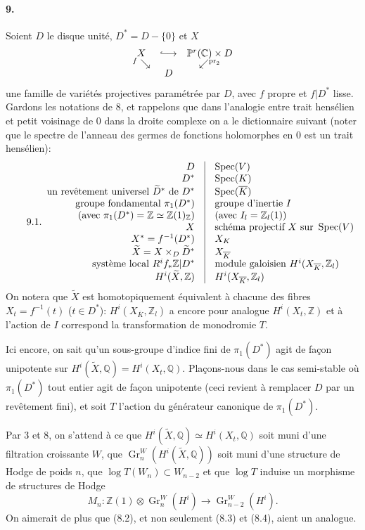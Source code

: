 \documentclass[10pt]{article}
\newcommand{\C}{\mathbb C}
\newcommand{\Q}{\mathbb Q}
\newcommand{\Z}{\mathbb Z}
\newcommand{\Gr}{\operatorname{Gr}}
\newcommand{\Spec}{\operatorname{Spec}}
\newcommand{\pr}{\operatorname{pr}}
\newcommand{\barK}{\overline{K}}
\newcommand{\wt}{\widetilde}
\begin{document}
\paragraph{9.} Soient $D$ le disque unité, $D^*=D-\{0\}$ et $X$
\[
\begin{array}{ccc}
X&\lhook\joinrel\longrightarrow&\mathbb P^r(\C)\times D\\[-0.2em]
{}^{f}\searrow&&\swarrow^{\pr_2}\\[-0.2em]
& D&
\end{array}
\]
une famille de variétés projectives paramétrée par $D$, avec $f$ propre et $f|D^*$ lisse. Gardons les notations de 8, et rappelons que dans l'analogie entre trait hensélien et petit voisinage de $0$ dans la droite complexe on a le dictionnaire suivant (noter que le spectre de l'anneau des germes de fonctions holomorphes en $0$ est un trait hensélien):
\[
\tag*{9.1.}
\begin{array}{r@{\quad\vrule\quad}l}
D & \Spec(V)\\
D^* & \Spec(K)\\
\text{un revêtement universel }\wt D^*\text{ de }D^* & \Spec(\barK)\\
\text{groupe fondamental }\pi_1(D^*) & \text{groupe d'inertie }I\\
\text{(avec }\pi_1(D^*)=\Z\simeq\Z(1)_\Z\text{)} & \text{(avec }I_l=\Z_l(1)\text{)}\\
X & \text{schéma projectif }X\text{ sur }\Spec(V)\\
X^*=f^{-1}(D^*) & X_K\\
\wt X=X\times_D\wt D^* & X_{\barK}\\
\text{système local }R^if_*\Z|D^* & \text{module galoisien }H^i(X_{\barK},\Z_l)\\
H^i(\wt X,\Z) & H^i(X_{\barK},\Z_l) %
\end{array}
\]
On notera que $\wt X$ est homotopiquement équivalent à chacune des fibres $X_t=f^{-1}(t)$ ($t\in D^*$): $H^i(X_{\barK},\Z_l)$ a encore pour analogue $H^i(X_t,\Z)$ et à l'action de $I$ correspond la transformation de monodromie $T$.

Ici encore, on sait qu'un sous-groupe d'indice fini de $\pi_1(D^*)$ agit de façon unipotente sur $H^i(\wt X,\Q)=H^i(X_t,\Q)$. Plaçons-nous dans le cas semi-stable où $\pi_1(D^*)$ tout entier agit de façon unipotente (ceci revient à remplacer $D$ par un revêtement fini), et soit $T$ l'action du générateur canonique de $\pi_1(D^*)$.

Par 3 et 8, on s'attend à ce que $H^i(\wt X,\Q)\simeq H^i(X_t,\Q)$ soit muni d'une filtration croissante $W$, que $\Gr_n^W(H^i(\wt X,\Q))$ soit muni d'une structure de Hodge de poids $n$, que $\log T(W_n)\subset W_{n-2}$ et que $\log T$ induise un morphisme de structures de Hodge %
\[
M_n:\Z(1)\otimes\Gr_n^W(H^i)\longrightarrow\Gr_{n-2}^W(H^i). %
\]
On aimerait de plus que (8.2), et non seulement (8.3) et (8.4), aient un analogue.
\end{document}
